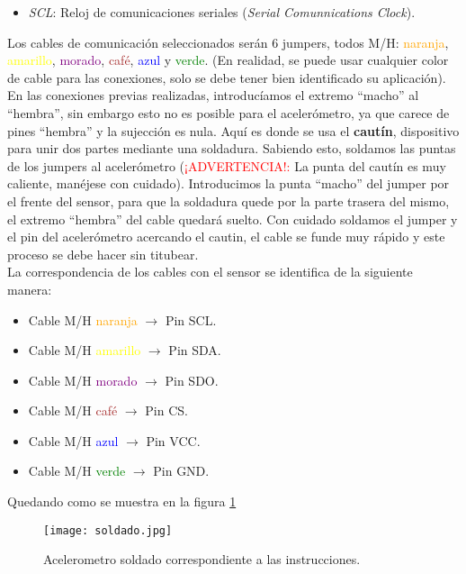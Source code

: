 \documentclass[10pt, a4paper, twocolumn]{article} %
\begin{document}
\begin{enumerate}
\begin{itemize}
        \item \textit{SCL}: Reloj de comunicaciones seriales (\textit{Serial Comunnications Clock}).
    \end{itemize}
Los cables de comunicación seleccionados serán 6 jumpers, todos M/H: \textcolor{orange}{naranja}, \textcolor{yellow}{amarillo}, \textcolor{purple}{morado}, \textcolor{brown}{café}, \textcolor{blue}{azul} y \textcolor{green}{verde}. (En realidad, se puede usar cualquier color de cable para las conexiones, solo se debe tener bien identificado su aplicación). En las conexiones previas realizadas, introducíamos el extremo ``macho'' al ``hembra'', sin embargo esto no es posible para el acelerómetro, ya que carece de pines ``hembra'' y la sujección es nula. Aquí es donde se usa el \textbf{cautín}, dispositivo para unir dos partes mediante una soldadura. Sabiendo esto, soldamos las puntas de los jumpers al acelerómetro (\textcolor{red}{¡ADVERTENCIA!:} La punta del cautín es muy caliente, manéjese con cuidado). Introducimos la punta ``macho'' del jumper por el frente del sensor, para que la soldadura quede por la parte trasera del mismo, el extremo ``hembra'' del cable quedará suelto. Con cuidado soldamos el jumper y el pin del acelerómetro acercando el cautin, el cable se funde muy rápido y este proceso se debe hacer sin titubear.\\ %
La correspondencia de los cables con el sensor se identifica de la siguiente manera:
    \begin{itemize}
		\item Cable M/H \textcolor{orange}{naranja} $\rightarrow$ Pin SCL.        
        \item Cable M/H \textcolor{yellow}{amarillo} $\rightarrow$ Pin SDA.
        \item Cable M/H \textcolor{purple}{morado} $\rightarrow$ Pin SDO.
        \item Cable M/H \textcolor{brown}{café} $\rightarrow$ Pin CS.
        \item Cable M/H \textcolor{blue}{azul} $\rightarrow$ Pin VCC.
        \item Cable M/H \textcolor{green}{verde} $\rightarrow$ Pin GND.
    \end{itemize}
Quedando como se muestra en la figura \ref{fg:soldadura}

\begin{figure}[h]
	\begin{center}
		\texttt{[image: soldado.jpg]} 
		\caption{Acelerometro soldado correspondiente a las instrucciones.}
		\label{fg:soldadura}
	\end{center}
\end{figure}


\end{enumerate}
\end{document}
